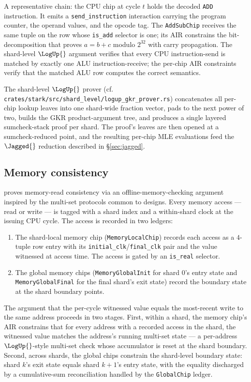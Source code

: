 A representative chain: the CPU chip at cycle $t$ holds the decoded \texttt{ADD} instruction. It emits a \texttt{send\_instruction} interaction carrying the program counter, the operand values, and the opcode tag. The \texttt{AddSubChip} receives the same tuple on the row whose \texttt{is\_add} selector is one; its AIR constrains the bit-decomposition that proves $a = b + c$ modulo $2^{32}$ with carry propagation. The shard-level $\LogUp{}$ argument verifies that every CPU instruction-send is matched by exactly one ALU instruction-receive; the per-chip AIR constraints verify that the matched ALU row computes the correct semantics.

The shard-level $\LogUp{}$ prover (cf. \texttt{crates/stark/src/shard\_level/logup\_gkr\_prover.rs}) concatenates all per-chip lookup leaves into one shard-wide fraction vector, pads to the next power of two, builds the GKR product-argument tree, and produces a single layered sumcheck-stack proof per shard. The proof's leaves are then opened at a sumcheck-reduced point, and the resulting per-chip MLE evaluations feed the $\Jagged{}$ reduction described in \S\ref{sec:jagged}.

\subsection{Memory consistency}
\label{sec:memory-consistency}

\Zirenver{} proves memory-read consistency via an offline-memory-checking argument inspired by the multi-set protocols common to \zkVM{} designs. Every memory access — read or write — is tagged with a shard index and a within-shard clock at the issuing CPU cycle. The access is recorded in two ledgers:

\begin{enumerate}
  \item The shard-local memory chip (\texttt{MemoryLocalChip}) records each access as a $4$-tuple row entry with its \texttt{initial\_clk}/\texttt{final\_clk} pair and the value witnessed at access time. The access is gated by an \texttt{is\_real} selector.
  \item The global memory chips (\texttt{MemoryGlobalInit} for shard $0$'s entry state and \texttt{MemoryGlobalFinal} for the final shard's exit state) record the boundary state at the shard boundary points.
\end{enumerate}

The argument that the per-cycle witnessed value equals the most-recent write to the same address proceeds in two stages. First, within a shard, the memory chip's AIR constrains that for every address with a recorded access in the shard, the witnessed value matches the address's running multi-set state — a per-address $\LogUp{}$-style multi-set check whose accumulator is reset at the shard boundary. Second, across shards, the global chips constrain the shard-level boundary state: shard $k$'s exit state equals shard $k+1$'s entry state, with the equality discharged by a cumulative-sum reconciliation handled by the \texttt{GlobalChip} ledger.

